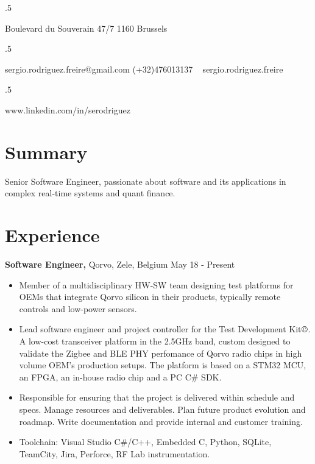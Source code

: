 \documentclass[margin]{res}
\begin{document}

\begin{resume}

\moveleft.5\hoffset\centerline{Boulevard du Souverain 47/7 1160 Brussels}
\moveleft.5\hoffset\centerline{sergio.rodriguez.freire@gmail.com \hspace{2 mm} \Mobilefone \hspace{1 mm} (+32)476013137 \hspace{2 mm} \faSkype\ \hspace{1 mm} sergio.rodriguez.freire}
\moveleft.5\hoffset\centerline{\faLinkedin \hspace{1 mm} www.linkedin.com/in/serodriguez}


\section{Summary}
Senior Software Engineer, passionate about software and its applications in complex real-time systems and quant finance.

\section{Experience}

 {\bf Software Engineer,} Qorvo, Zele, Belgium \hfill May 18 - Present
 \begin{itemize} \itemsep -2pt
 \item Member of a multidisciplinary HW-SW team designing test platforms for OEMs that integrate Qorvo silicon in their products, typically remote controls and low-power sensors.
 \item Lead software engineer and project controller for the Test Development Kit$\copyright$. A low-cost transceiver platform in the 2.5GHz band, custom designed to validate the Zigbee and BLE PHY perfomance of Qorvo radio chips in high volume OEM's production setups. The platform is based on a STM32 MCU, an FPGA, an in-house radio chip and a PC C# SDK.
 \item Responsible for ensuring that the project is delivered within schedule and specs. Manage resources and deliverables. Plan future product evolution and roadmap. Write documentation and provide internal and customer training.
 \item Toolchain: Visual Studio C\#/C++, Embedded C, Python, SQLite, TeamCity, Jira, Perforce, RF Lab instrumentation.
\end{itemize}


\end{resume}
\end{document}
